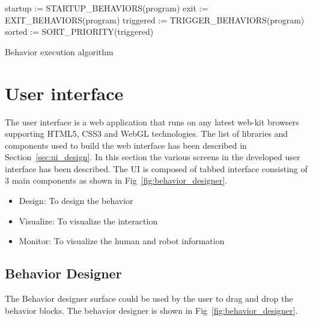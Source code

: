 \begin{algorithm}[H]
 startup := STARTUP\_BEHAVIORS(program)\;
 exit := EXIT\_BEHAVIORS(program)\;
 triggered := TRIGGER\_BEHAVIORS(program)\;
 sorted := SORT\_PRIORITY(triggered)\;
 \caption{Behavior execution algorithm}
 \label{alg:behavior_engine}
\end{algorithm}

\section{User interface}
\label{ssec:ui_comp}
The user interface is a web application that runs on any latest web-kit browsers supporting HTML5, CSS3 and WebGL technologies. The list of libraries and components used to build the web interface has been described in Section~\ref{sec:ui_design}. In this section the various screens in the developed user interface has been described. The UI is composed of tabbed interface consisting of 3 main components as shown in Fig~\ref{fig:behavior_designer}.
\begin{itemize}
\item Design: To design the behavior
\item Visualize: To visualize the interaction
\item Monitor: To visualize the human and robot information
\end{itemize}

\subsection*{Behavior Designer} The Behavior designer surface could be used by the user to drag and drop the behavior blocks. The behavior designer is shown in Fig~\ref{fig:behavior_designer}.


